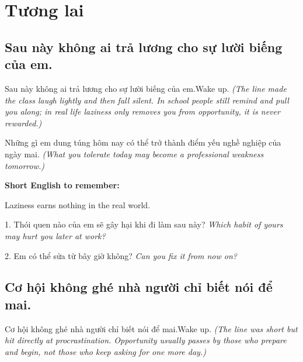 \chapter{Tương lai}

\section{Sau này không ai trả lương cho sự lười biếng của em.}
\begin{truyen}{Sau này không ai trả lương cho sự lười biếng của em.}{Wake up.}
\textit{(The line made the class laugh lightly and then fall silent. In school people still remind and pull you along; in real life laziness only removes you from opportunity, it is never rewarded.)}
\end{truyen}

\begin{baihoc}
Những gì em dung túng hôm nay có thể trở thành điểm yếu nghề nghiệp của ngày mai.
\textit{(What you tolerate today may become a professional weakness tomorrow.)}
\end{baihoc}

\begin{ghinhoanh}
\textbf{Short English to remember:}

Laziness earns nothing in the real world.

\end{ghinhoanh}

\begin{tuhocnhanh}
1. Thói quen nào của em sẽ gây hại khi đi làm sau này? \textit{Which habit of yours may hurt you later at work?}

2. Em có thể sửa từ bây giờ không? \textit{Can you fix it from now on?}
\end{tuhocnhanh}
\ngancach

\section{Cơ hội không ghé nhà người chỉ biết nói để mai.}
\begin{truyen}{Cơ hội không ghé nhà người chỉ biết nói để mai.}{Wake up.}
\textit{(The line was short but hit directly at procrastination. Opportunity usually passes by those who prepare and begin, not those who keep asking for one more day.)}
\end{truyen}

